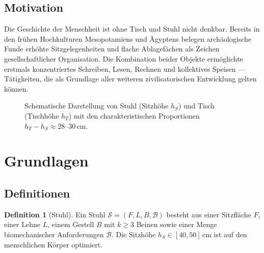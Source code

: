 ﻿\documentclass[a4paper,12pt]{article}
\theoremstyle{definition}
\newtheorem{definition}{Definition}
\begin{document}
\subsection{Motivation}

Die Geschichte der Menschheit ist ohne Tisch und Stuhl nicht denkbar. Bereits in den
fr\"{u}hen Hochkulturen Mesopotamiens und \"{A}gyptens belegen arch\"{a}ologische Funde erh\"{o}hte
Sitzgelegenheiten und flache Ablagef\"{a}chen als Zeichen gesellschaftlicher Organisation.
Die Kombination beider Objekte erm\"{o}glichte erstmals konzentriertes Schreiben, Lesen,
Rechnen und kollektives Speisen --- T\"{a}tigkeiten, die als Grundlage aller weiteren
zivilisatorischen Entwicklung gelten k\"{o}nnen.

\begin{figure}[h]
\centering
{}
\caption{Schematische Darstellung von Stuhl (Sitzh\"{o}he $h_S$) und Tisch (Tischh\"{o}he $h_T$)
mit den charakteristischen Proportionen $h_T - h_S \approx 28\text{--}30\,\mathrm{cm}$.}
\label{fig:tischstuhl}
\end{figure}

\section{Grundlagen}

\subsection{Definitionen}

\begin{definition}[Stuhl]
	Ein Stuhl $\mathcal{S} = (F, L, B, \mathcal{B})$ besteht aus einer Sitzfl\"{a}che $F$,
	einer Lehne $L$, einem Gestell $B$ mit $k \geq 3$ Beinen sowie einer Menge
	biomechanischer Anforderungen $\mathcal{B}$. Die Sitzh\"{o}he $h_S \in [40, 50]\,\mathrm{cm}$
	ist auf den menschlichen K\"{o}rper optimiert.
\end{definition}
\end{document}
